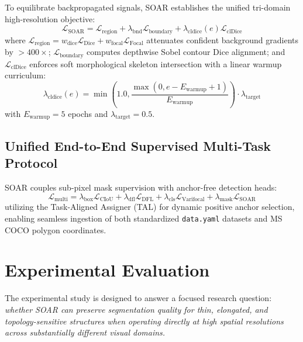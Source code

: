 \documentclass[11pt,a4paper]{article}
\begin{document}
To equilibrate backpropagated signals, SOAR establishes the unified tri-domain high-resolution objective:
\begin{equation}
\label{eq:soar_loss}
\mathcal{L}_{\text{SOAR}} = \mathcal{L}_{\text{region}} + \lambda_{\text{bnd}} \mathcal{L}_{\text{boundary}} + \lambda_{\text{cldice}}(e) \mathcal{L}_{\text{clDice}}
\end{equation}
where $\mathcal{L}_{\text{region}} = w_{\text{dice}} \mathcal{L}_{\text{Dice}} + w_{\text{focal}} \mathcal{L}_{\text{Focal}}$ attenuates confident background gradients by $>400\times$; $\mathcal{L}_{\text{boundary}}$ computes depthwise Sobel contour Dice alignment; and $\mathcal{L}_{\text{clDice}}$ enforces soft morphological skeleton intersection \cite{shit2021cldice} with a linear warmup curriculum:
\begin{equation}
\lambda_{\text{cldice}}(e) = \min\left(1.0, \frac{\max(0, e - E_{\text{warmup}} + 1)}{E_{\text{warmup}}}\right) \cdot \lambda_{\text{target}}
\end{equation}
with $E_{\text{warmup}} = 5$ epochs and $\lambda_{\text{target}} = 0.5$.

\subsection{Unified End-to-End Supervised Multi-Task Protocol}
SOAR couples sub-pixel mask supervision with anchor-free detection heads:
\begin{equation}
\mathcal{L}_{\text{multi}} = \lambda_{\text{box}} \mathcal{L}_{\text{CIoU}} + \lambda_{\text{dfl}} \mathcal{L}_{\text{DFL}} + \lambda_{\text{cls}} \mathcal{L}_{\text{Varifocal}} + \lambda_{\text{mask}} \mathcal{L}_{\text{SOAR}}
\end{equation}
utilizing the Task-Aligned Assigner (TAL) \cite{feng2021tood} for dynamic positive anchor selection, enabling seamless ingestion of both standardized \texttt{data.yaml} datasets and MS COCO polygon coordinates.

\section{Experimental Evaluation}

The experimental study is designed to answer a focused research question: 
\emph{whether SOAR can preserve segmentation quality for thin, elongated, and 
topology-sensitive structures when operating directly at high spatial 
resolutions across substantially different visual domains.}
\end{document}
